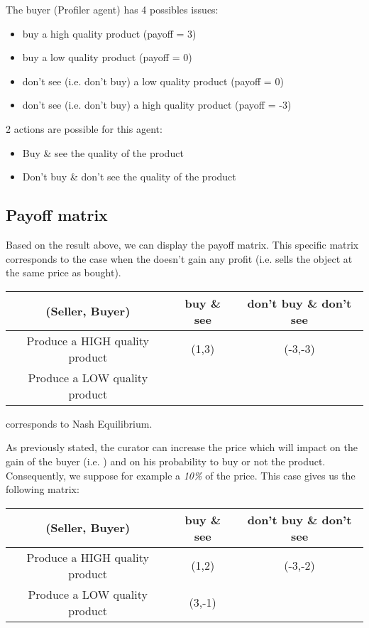 \documentclass[a4paper,11pt]{article}
\begin{document}
  The buyer (Profiler agent) has 4 possibles issues:
  \begin{itemize}
   \item buy a high quality product (payoff = 3)
   \item buy a low quality product (payoff = 0)
   \item don't see (i.e. don't buy) a low quality product (payoff = 0)
   \item don't see (i.e. don't buy) a high quality product (payoff = -3)
  \end{itemize}
  
  2 actions are possible for this agent:
  \begin{itemize}
   \item Buy \& see the quality of the product
   \item Don't buy \& don't see the quality of the product
  \end{itemize}
  
  \subsection{Payoff matrix}
  
  Based on the result above, we can display the payoff matrix. This specific matrix corresponds to the case when the \cu{} doesn't gain
  any profit (i.e. sells the object at the same price as bought).
  
  \begin{tabular}{|c|c|c|}\hline
   (Seller, Buyer) & buy \& see & don't buy \& don't see \\\hline
   Produce a HIGH quality product & (1,3) & (-3,-3) \\\hline
   Produce a LOW quality product & \color{red}{(3,0)} & \color{red}{(-1,0)} \\\hline
  \end{tabular}

  \color{red}{Red values}\color{black}{} corresponds to Nash Equilibrium.

  As previously stated, the curator can increase the price which will impact on the gain of the buyer (i.e. \pa{}) and on his
  probability to buy or not the product. Consequently, we suppose for example a \textit{10\%} of the price. 
  This case gives us the following matrix:
  
   \begin{tabular}{|c|c|c|}\hline
   (Seller, Buyer) & buy \& see & don't buy \& don't see \\\hline
   Produce a HIGH quality product & (1,2) & (-3,-2) \\\hline
   Produce a LOW quality product & (3,-1) & \color{red}{(-1,1)} \\\hline
  \end{tabular}
  
\end{document}
